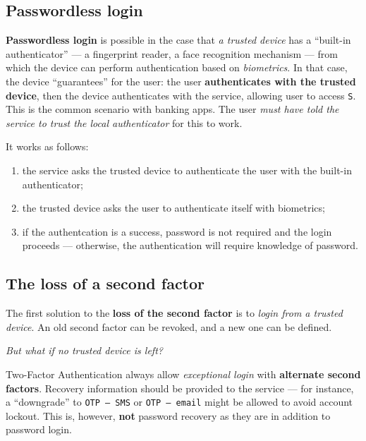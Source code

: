 \documentclass[10pt]{\classname}
\begin{document}
\subsection{Passwordless login}

\textbf{Passwordless login} is possible in the case that \emph{a trusted
device} has a ``built\--in authenticator'' --- a fingerprint reader, a face
recognition mechanism --- from which the device can perform authentication based
on \emph{biometrics}. In that case, the device ``guarantees'' for the user: the
user \textbf{authenticates with the trusted device}, then the device
authenticates with the service, allowing user to access \texttt{S}. This is the
common scenario with banking apps. The user \emph{must have told the service to
trust the local authenticator} for this to work.

It works as follows:
\begin{enumerate}
    \item the service asks the trusted device to authenticate the user with the
        built\--in authenticator;
    \item the trusted device asks the user to authenticate itself with
        biometrics;
    \item if the authentcation is a success, password is not required and the
        login proceeds --- otherwise, the authentication will require knowledge
        of password.
\end{enumerate}

\subsection{The loss of a second factor}

The first solution to the \textbf{loss of the second factor} is to \emph{login
from a trusted device}. An old second factor can be revoked, and a new one can
be defined. 

\vspace*{1cm}\begin{center}\emph{But what if no trusted device is left?}\end{center}\vspace*{1cm}

Two\--Factor Authentication always allow \emph{exceptional login} with
\textbf{alternate second factors}. Recovery information should be provided to
the service --- for instance, a ``downgrade'' to \texttt{OTP --- SMS} or
\texttt{OTP --- email} might be allowed to avoid account lockout. This is,
however, \textbf{not} password recovery as they are in addition to password
login.
\end{document}
